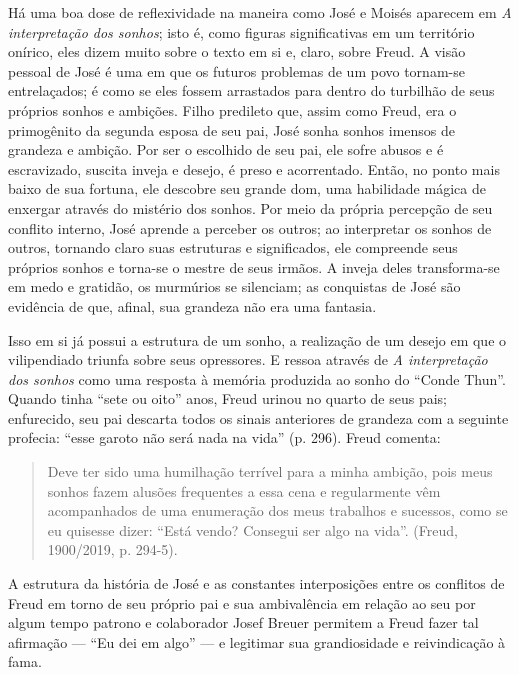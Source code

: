 Há uma boa dose de reflexividade na maneira como José e Moisés aparecem
em \emph{A interpretação dos sonhos}; isto é, como figuras
significativas em um território onírico, eles dizem muito sobre o texto
em si e, claro, sobre Freud. A visão pessoal de José é uma em que os
futuros problemas de um povo tornam-se entrelaçados; é como se eles
fossem arrastados para dentro do turbilhão de seus próprios sonhos e
ambições. Filho predileto que, assim como Freud, era o primogênito da
segunda esposa de seu pai, José sonha sonhos imensos de grandeza e
ambição. Por ser o escolhido de seu pai, ele sofre abusos e é
escravizado, suscita inveja e desejo, é preso e acorrentado. Então, no
ponto mais baixo de sua fortuna, ele descobre seu grande dom, uma
habilidade mágica de enxergar através do mistério dos sonhos. Por meio
da própria percepção de seu conflito interno, José aprende a perceber os
outros; ao interpretar os sonhos de outros, tornando claro suas
estruturas e significados, ele compreende seus próprios sonhos e
torna-se o mestre de seus irmãos. A inveja deles transforma-se em medo e
gratidão, os murmúrios se silenciam; as conquistas de José são evidência
de que, afinal, sua grandeza não era uma fantasia.

Isso em si já possui a estrutura de um sonho, a realização de um desejo
em que o vilipendiado triunfa sobre seus opressores. E ressoa através de
\emph{A interpretação dos sonhos} como uma resposta à memória produzida
ao sonho do ``Conde Thun''. Quando tinha ``sete ou oito'' anos, Freud
urinou no quarto de seus pais; enfurecido, seu pai descarta todos os
sinais anteriores de grandeza com a seguinte profecia: ``esse garoto não
será nada na vida'' (p. 296). Freud comenta:

\begin{quote}
Deve ter sido uma humilhação terrível para a minha ambição, pois meus
sonhos fazem alusões frequentes a essa cena e regularmente vêm
acompanhados de uma enumeração dos meus trabalhos e sucessos, como se eu
quisesse dizer: ``Está vendo? Consegui ser algo na vida''. (Freud,
1900/2019, p. 294-5).
\end{quote}

A estrutura da história de José e as constantes interposições entre os
conflitos de Freud em torno de seu próprio pai e sua ambivalência em
relação ao seu por algum tempo patrono e colaborador Josef Breuer
permitem a Freud fazer tal afirmação --- ``Eu dei em algo'' --- e legitimar
sua grandiosidade e reivindicação à fama.

